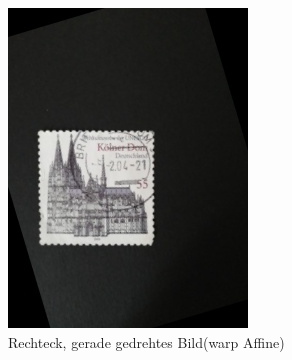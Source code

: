 \documentclass[12pt,toc=bib,toc=listof]{scrreprt}
\begin{document}
\begin{figure}[h]
\begin{minipage}[t]{.2\linewidth}
  \includegraphics[width=\linewidth]{./bilder/rot_col}
  \caption{Rechteck, gerade gedrehtes Bild(warp Affine)}
  \label{fig:bv_rotimg}
\end{minipage}
\end{figure}
\end{document}
